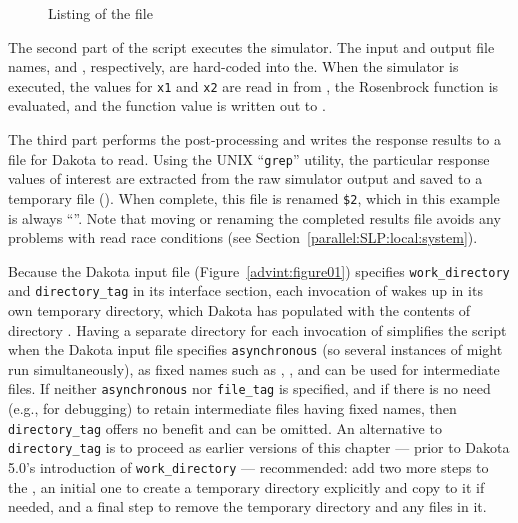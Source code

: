 \begin{figure}
  \centering
  \begin{bigbox}
    \begin{small}
    \end{small}
  \end{bigbox}
  \caption{Listing of the \protect{} file}
  \label{advint:figure04}
\end{figure}

The second part of the script executes the 
simulator. The input and output file names,  and
, respectively, are hard-coded into the. When the 
 simulator is executed, the values for \texttt{x1} 
and \texttt{x2} are read in from , the Rosenbrock function is evaluated,
and the function value is written out to .

The third part performs the post-processing and writes the response
results to a file for Dakota to read. Using the UNIX ``\texttt{grep}'' utility, the
particular response values of interest are extracted from the raw
simulator output and saved to a temporary file ().
When complete, this file is renamed \texttt{\$2}, which in this
example is always ``''.
Note that moving or renaming the completed results file
avoids any problems with read race
conditions (see Section~\ref{parallel:SLP:local:system}).


Because the Dakota input file 
(Figure~\ref{advint:figure01}) specifies
\texttt{work\_directory} and \texttt{directory\_tag} in its interface
section, each invocation of  wakes up in
its own temporary directory, which Dakota has populated with the
contents of directory . Having a separate directory
for each invocation of  simplifies the script
when the Dakota input file specifies \texttt{asynchronous} (so
several instances of  might run simultaneously),
as fixed names such as , , and 
can be used for intermediate files. If neither \texttt{asynchronous} nor
\texttt{file\_tag} is specified, and if there is no need (e.g., for debugging)
to retain intermediate files having fixed names, then \texttt{directory\_tag}
offers no benefit and can be omitted. An alternative to \texttt{directory\_tag}
is to proceed as earlier versions of this chapter --- prior to Dakota 5.0's
introduction of \texttt{work\_directory} --- recommended:  add two more
steps to the ,
an initial one to create a temporary directory explicitly and
copy  to it if needed, and a final step to remove the temporary
directory and any files in it.

